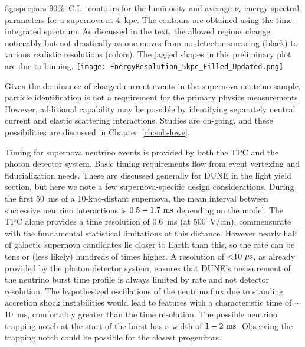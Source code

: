 

\begin{dunefigure}
{fig:specpars}
{90\%~C.L.\ contours for the luminosity and average $\nu_e$ energy
spectral parameters for a supernova
at 4~kpc.  The contours are obtained using the time-integrated
spectrum.  As discussed in the text, the allowed regions
change noticeably but not drastically as one moves from
no detector smearing (black) to various realistic resolutions (colors).
The jagged shapes in this preliminary plot are due to binning.}
  \texttt{[image: EnergyResolution\_5kpc\_Filled\_Updated.png]}
\end{dunefigure}

Given the dominance of \nue{} charged current events in the
supernova neutrino sample, particle identification is not a
requirement for the primary physics measurements.  However,
additional capability may be possible by identifying separately
neutral current and elastic scattering interactions.  Studies
are on-going, and these possibilities are discussed in 
Chapter~\ref{ch:snb-lowe}.

Timing for supernova neutrino events is provided by both the
TPC and the photon detector system.  Basic timing requirements
flow from event vertexing and fiducialization needs.  These are
discussed generally for DUNE in the light yield section, but
here we note a few supernova-specific design considerations.
During the first 50~ms of a 10-kpc-distant supernova, the
mean interval between successive neutrino interactions is
$0.5 - 1.7~\rm{ms}$ depending on the model.  The TPC alone
provides a time resolution of 0.6~ms (at 500~V/cm), commensurate
with the fundamental statistical limitations at this distance.
However nearly half of galactic supernova candidates lie closer
to Earth than this, so the rate can be tens or (less likely)
hundreds of times higher.  A resolution of $\mathord{<}10~\mu\rm{s}$,
as already provided by the photon detector system, ensures that
DUNE's measurement of the neutrino burst time profile is always
limited by rate and not detector resolution.  The hypothesized
oscillations of the neutrino flux due to standing accretion shock
instabilities would lead to features with a characteristic time
of $\sim$10~ms, comfortably greater than the time resolution.
The possible neutrino trapping notch at the start of the burst
has a width of $1 - 2~\rm{ms}$.  Observing the trapping notch
could be possible for the closest progenitors.

